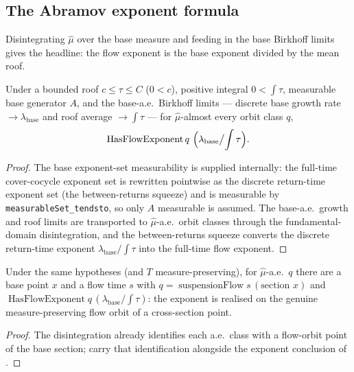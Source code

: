\subsection{The Abramov exponent formula}

Disintegrating $\hat\mu$ over the base measure and feeding in the base Birkhoff limits gives the
headline: the flow exponent is the base exponent divided by the mean roof.

\begin{theorem}[The special-flow Lyapunov exponent, $\lambda_{\mathrm{flow}} = \lambda_{\mathrm{base}}/\int\tau$]\label{thm:susp-abramovExp}
  \leanok
  Under a bounded roof $c \le \tau \le C$ ($0 < c$), positive integral $0 < \int\tau$, measurable
  base generator $A$, and the base-a.e.\ Birkhoff limits --- discrete base growth rate
  $\to \lambda_{\mathrm{base}}$ and roof average $\to \int\tau$ --- for $\hat\mu$-almost every
  orbit class $q$,
  \[
    \operatorname{HasFlowExponent} q\ \Bigl(\lambda_{\mathrm{base}}\big/\!\int\tau\Bigr).
  \]
\end{theorem}
\begin{proof}\leanok
  The base exponent-set measurability is supplied internally: the full-time cover-cocycle exponent
  set is rewritten pointwise as the discrete return-time exponent set (the between-returns squeeze)
  and is measurable by \texttt{measurableSet\_tendsto}, so only $A$ measurable is assumed. The
  base-a.e.\ growth and roof limits are transported to $\hat\mu$-a.e.\ orbit classes through the
  fundamental-domain disintegration, and the between-returns squeeze converts the discrete
  return-time exponent $\lambda_{\mathrm{base}}/\int\tau$ into the full-time flow exponent.
\end{proof}

\begin{theorem}\label{thm:susp-abramovExpFlow}
  \leanok
  Under the same hypotheses (and $T$ measure-preserving), for $\hat\mu$-a.e.\ $q$ there are a base
  point $x$ and a flow time $s$ with $q = \operatorname{suspensionFlow} s\,(\text{section } x)$ and
  $\operatorname{HasFlowExponent} q\,(\lambda_{\mathrm{base}}/\int\tau)$: the exponent is realised
  on the genuine measure-preserving flow orbit of a cross-section point.
\end{theorem}
\begin{proof}\leanok
  The disintegration already identifies each a.e.\ class with a flow-orbit point of the base
  section; carry that identification alongside the exponent conclusion of
  .
\end{proof}

